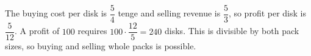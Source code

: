 The buying cost per disk is $\dfrac{5}{4}$ tenge and selling revenue is $\dfrac{5}{3}$, so profit per disk is $\dfrac{5}{12}$. A profit of $100$ requires $100\cdot\dfrac{12}{5}=\boxed{240}$ disks. This is divisible by both pack sizes, so buying and selling whole packs is possible.
